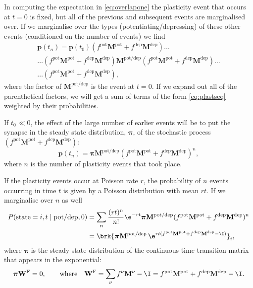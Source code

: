\documentclass[12pt]{article}
\newcommand{\prm}{p}
\newcommand{\pr}{\mathbf{\prm}}
\newcommand{\eqm}{\pi}
\newcommand{\eq}{\boldsymbol{\eqm}}
\newcommand{\Wm}{W}
\newcommand{\W}{\mathbf{\Wm}}
\newcommand{\MMdm}{M}
\newcommand{\MMd}{\mathbf{\MMdm}}
\newcommand{\frg}{\W^{\mathrm{F}}}
\newcommand{\pot}{^{\text{pot}}}
\newcommand{\dep}{^{\text{dep}}}
\newcommand{\potdep}{^{\text{pot/dep}}}
\begin{document}
In computing the expectation in \eqref{eq:overlapone} the plasticity event that occurs at $t=0$ is fixed, but all of the previous and subsequent events are marginalised over.
If we marginalise over the types (potentiating/depressing) of these other events (conditioned on the number of events) we find
%
\begin{multline}\label{eq:plastseqtypes}
  \pr(t_n) = \pr(t_0) (f\pot \MMd \pot + f\dep \MMd \dep)  \ldots \\
    \ldots (f\pot \MMd \pot + f\dep \MMd \dep) 
     \MMd \potdep (f\pot \MMd \pot + f\dep \MMd \dep) \ldots \\
    \ldots (f\pot \MMd \pot + f\dep \MMd \dep),
\end{multline}
% 
where the factor of $ \MMd \potdep$ is the event at $t=0$.
If we expand out all of the parenthetical factors, we will get a sum of terms of the form \eqref{eq:plastseq} weighted by their probabilities.

If $t_0 \ll 0$, the effect of the large number of earlier events will be to put the synapse in the steady state distribution, $\eq$, of the stochastic process $(f\pot \MMd \pot+f\dep \MMd \dep)$:
%
\begin{equation}\label{eq:plastseqeq}
  \pr(t_n) = \eq  \MMd \potdep (f\pot \MMd \pot+f\dep \MMd \dep)^n,
\end{equation}
%
where $n$ is the number of plasticity events that took place.

If the plasticity events occur at Poisson rate $r$, the probability of $n$ events occurring in time $t$ is given by a Poisson distribution with mean $rt$.
If we marginalise over $n$ as well
%
\begin{equation}\label{eq:plastseqav}
\begin{aligned}
  P(\text{state}=i,t \mid \text{pot/dep},0)
    &= \sum_n \frac{(rt)^n}{n!} \e^{-rt} \eq  \MMd \potdep (f\pot \MMd \pot+f\dep \MMd \dep)^n \\
    &= \brk{ \eq  \MMd \potdep\, \e^{rt(f\pot \MMd \pot+f\dep \MMd \dep-\I) } }_i,
\end{aligned}
\end{equation}
%
where $\eq$ is the steady state distribution of the continuous time transition matrix that appears in the exponential:
%
\begin{equation}\label{eq:eq}
  \eq\frg = 0,
  \qquad\text{where}\quad
  \frg = \sum_\nu f^\nu \MMd^\nu - \I
    = f\pot \MMd \pot + f\dep \MMd \dep - \I.
\end{equation}
%
\end{document}
